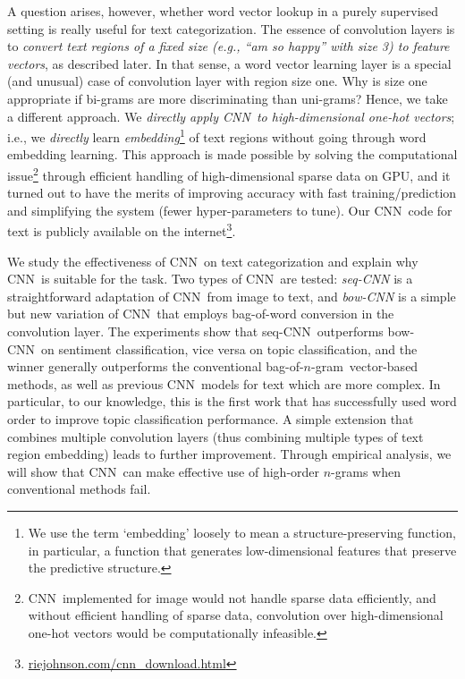 \documentclass[11pt,letterpaper]{article}
\newcommand{\cnn}{CNN}
\newcommand{\scnn}{seq-CNN}
\newcommand{\bcnn}{bow-CNN}
\newcommand{\bongram}{bag-of-$n$-gram}
\begin{document}
A question arises, however, whether word vector lookup in a purely supervised setting 
is really useful for text categorization.  
The essence of convolution layers is to {\em convert text regions 
of a fixed size (e.g., ``am so happy'' with size 3) to feature vectors}, as described later. 
In that sense, a word vector learning layer is a special (and unusual) case of convolution layer with 
region size one.  
Why is size one appropriate if bi-grams are more discriminating than uni-grams? 
Hence, we take a different approach.  
We {\em directly apply \cnn\ to high-dimensional one-hot vectors};  
i.e., we {\em directly} learn {\em embedding}\footnote{
  We use the term `embedding' loosely to mean a structure-preserving function, 
  in particular, a function that generates low-dimensional features 
  that preserve the predictive structure. 
} of text regions without going through word embedding learning.  
This approach is made possible by solving the computational issue\footnote{
  \cnn\ implemented for image would not handle sparse data efficiently, and 
  without efficient handling of sparse data, 
  convolution over high-dimensional one-hot vectors would be computationally infeasible. 
}
through efficient handling of high-dimensional sparse data 
on GPU, and 
it turned out to have the merits of 
improving accuracy 
with fast training/prediction 
and simplifying the system (fewer hyper-parameters to tune).  
Our 
\cnn\ code for text is publicly available on the internet\footnote{
  \url{riejohnson.com/cnn_download.html}
}.  

We 
study the effectiveness of \cnn\
on text categorization and explain why \cnn\ is suitable for the task.  
Two types of \cnn\ are tested: 
{\em \scnn} is a straightforward adaptation of \cnn\ from image to text, and 
{\em \bcnn} is a simple but new variation of \cnn\ that employs bag-of-word conversion 
in the convolution layer.  
The experiments show that \scnn\ outperforms \bcnn\ on sentiment classification, 
vice versa on topic classification, 
and the winner generally outperforms the conventional \bongram\ vector-based methods, as well as 
previous \cnn\ models for text which are more complex. 
In particular, to our knowledge, this is the first work that has successfully used 
word order to improve topic classification performance.  
A simple extension that combines multiple convolution layers (thus 
combining multiple types of text region embedding) 
leads to further improvement.  
Through empirical analysis, we will show that 
\cnn\ can make effective use of high-order $n$-grams when conventional methods fail.  
\end{document}
